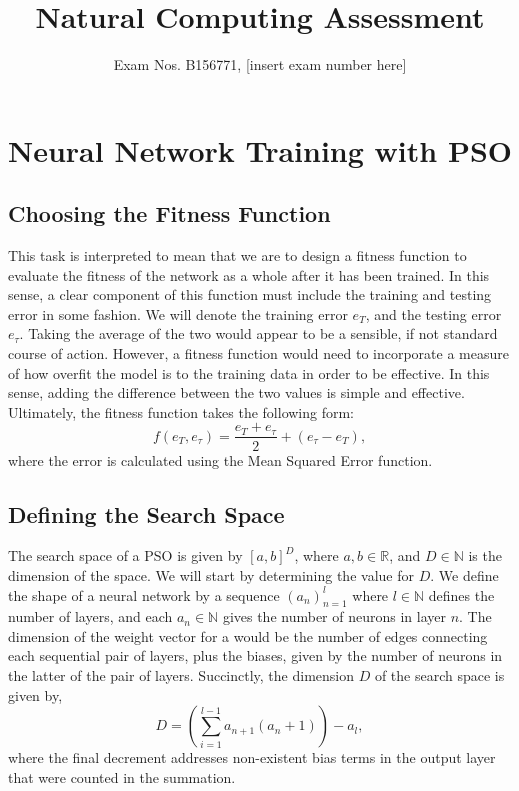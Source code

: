 \documentclass[12pt]{article}
\title{Natural Computing Assessment}
\author{Exam Nos. B156771, [insert exam number here]}
\begin{document}
\maketitle
\section{Neural Network Training with PSO}
\subsection{Choosing the Fitness Function}
This task is interpreted to mean that we are to design a fitness function to evaluate the fitness of the network as a whole after it has been trained. In this sense, a clear component of this function must include the training and testing error in some fashion. We will denote the training error $e_T$, and the testing error $e_\tau$. Taking the average of the two would appear to be a sensible, if not standard course of action. However, a fitness function would need to incorporate a measure of how overfit the model is to the training data in order to be effective. In this sense, adding the difference between the two values is simple and effective. Ultimately, the fitness function takes the following form:
\begin{equation}
    f(e_T, e_\tau) = \frac{e_T + e_\tau}{2} + \left(e_\tau - e_T\right),
\end{equation}
where the error is calculated using the Mean Squared Error function.

\subsection{Defining the Search Space}
The search space of a PSO is given by $[a,b]^D$, where $a,b\in \mathbb{R}$, and $D\in\mathbb{N}$ is the dimension of the space. 
We will start by determining the value for $D$.
We define the shape of a neural network by a sequence $(a_n)_{n=1}^{l}$ where $l\in\mathbb{N}$ defines the number of layers, and each $a_n \in \mathbb{N}$ gives the number of neurons in layer $n$. 
The dimension of the weight vector for a would be the number of edges connecting each sequential pair of layers, plus the biases, given by the number of neurons in the latter of the pair of layers. Succinctly, the dimension $D$ of the search space is given by,
\begin{equation}
    D = \left(\sum_{i=1}^{l-1} a_{n+1}\left(a_n + 1\right)\right) - a_l,
\end{equation}
where the final decrement addresses non-existent bias terms in the output layer that were counted in the summation.
\end{document}
